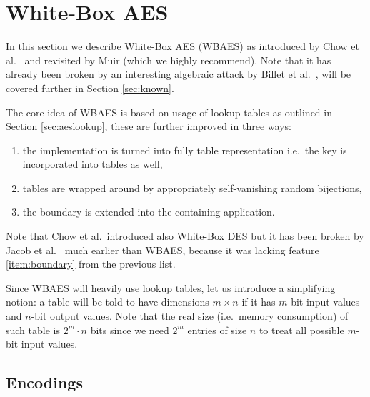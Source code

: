 \section{White-Box AES}
\label{sec:wbaes}

In this section we describe White-Box AES (WBAES) as introduced by Chow et al.\ \cite{chow2002aes} and revisited by Muir \cite{muir2013tutorial} (which we highly recommend). Note that it has already been broken by an interesting algebraic attack by Billet et al.\ \cite{billet2004cryptanalysis}, will be covered further in Section \ref{sec:known}.

The core idea of WBAES is based on usage of lookup tables as outlined in Section \ref{sec:aeslookup}, these are further improved in three ways:
\begin{enumerate}
	\item the implementation is turned into fully table representation i.e.\ the key is incorporated into tables as well,
	\item tables are wrapped around by appropriately self-vanishing random bijections, \label{item:wrap}
	\item the boundary is extended into the containing application. \label{item:boundary}
\end{enumerate}
Note that Chow et al.\ introduced also White-Box DES \cite{chow2002des} but it has been broken by Jacob et al.\ \cite{jacob2002attacking} much earlier than WBAES, because it was lacking feature \ref{item:boundary} from the previous list.

\begin{notion}
\label{notion:table}
	Since WBAES will heavily use lookup tables, let us introduce a simplifying notion: a table will be told to have dimensions $m\times n$ if it has $m$-bit input values and $n$-bit output values. Note that the real size (i.e.\ memory consumption) of such table is $2^m\cdot n$ bits since we need $2^m$ entries of size $n$ to treat all possible $m$-bit input values.
\end{notion}



\subsection{Encodings}
\label{sec:encod}

